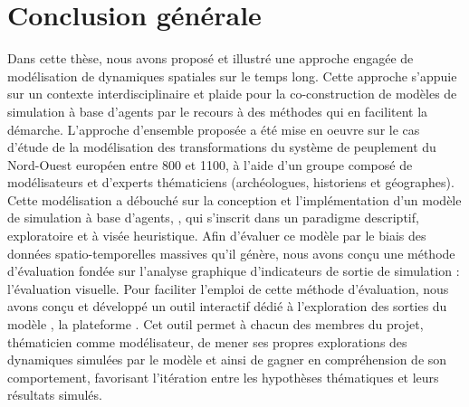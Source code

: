 \graphicspath{{chap7-Conclusion/}}

\chapter*{Conclusion générale}
\label{chap:conclu}

Dans cette thèse, nous avons proposé et illustré une approche engagée de modélisation de dynamiques spatiales sur le temps long.
Cette approche s'appuie sur un contexte interdisciplinaire et plaide pour la co-construction de modèles de simulation à base d'agents par le recours à des méthodes qui en facilitent la démarche.
L'approche d'ensemble proposée a été mise en oeuvre sur le cas d'étude de la modélisation des transformations du système de peuplement du Nord-Ouest européen entre 800 et 1100, à l'aide d'un groupe composé de modélisateurs et d'experts thématiciens (archéologues, historiens et géographes).
Cette modélisation a débouché sur la conception et l'implémentation d'un modèle de simulation à base d'agents, \simfeodal{}, qui s'inscrit dans un paradigme descriptif, exploratoire et à visée heuristique.
Afin d'évaluer ce modèle par le biais des données spatio-temporelles massives qu'il génère, nous avons conçu une méthode d'évaluation fondée sur l'analyse graphique d'indicateurs de sortie de simulation :
	l'évaluation visuelle.
Pour faciliter l'emploi de cette méthode d'évaluation, nous avons conçu et développé un outil interactif dédié à l'exploration des sorties du modèle \simfeodal{}, la plateforme \simedb{}.
Cet outil permet à chacun des membres du projet, thématicien comme modélisateur, de mener ses propres explorations des dynamiques simulées par le modèle et ainsi de gagner en compréhension de son comportement, favorisant l'itération entre les hypothèses thématiques et leurs résultats simulés.

